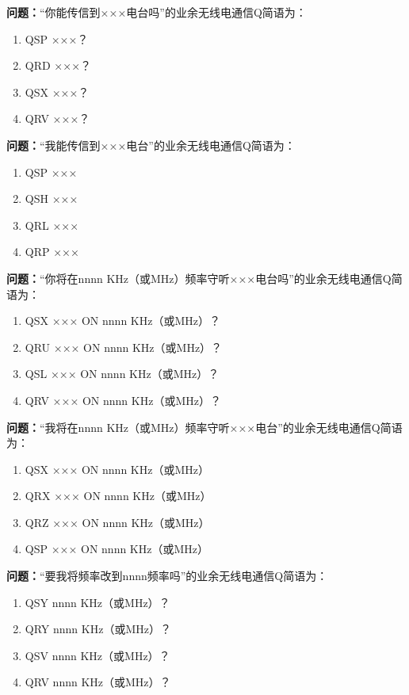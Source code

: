 \bigskip


\noindent\textbf{问题：}“你能传信到×××电台吗”的业余无线电通信Q简语为：
\begin{enumerate}[label=\Alph*), leftmargin=3em]
\item QSP ×××？
\item QRD ×××？
\item QSX ×××？
\item QRV ×××？
\end{enumerate}

\bigskip


\noindent\textbf{问题：}“我能传信到×××电台”的业余无线电通信Q简语为：
\begin{enumerate}[label=\Alph*), leftmargin=3em]
\item QSP ×××
\item QSH ×××
\item QRL ×××
\item QRP ×××
\end{enumerate}

\bigskip


\noindent\textbf{问题：}“你将在nnnn KHz（或MHz）频率守听×××电台吗”的业余无线电通信Q简语为：
\begin{enumerate}[label=\Alph*), leftmargin=3em]
\item QSX ××× ON nnnn KHz（或MHz）？
\item QRU ××× ON nnnn KHz（或MHz）？
\item QSL ××× ON nnnn KHz（或MHz）？
\item QRV ××× ON nnnn KHz（或MHz）？
\end{enumerate}

\bigskip


\noindent\textbf{问题：}“我将在nnnn KHz（或MHz）频率守听×××电台”的业余无线电通信Q简语为：
\begin{enumerate}[label=\Alph*), leftmargin=3em]
\item QSX ××× ON nnnn KHz（或MHz）
\item QRX ××× ON nnnn KHz（或MHz）
\item QRZ ××× ON nnnn KHz（或MHz）
\item QSP ××× ON nnnn KHz（或MHz）
\end{enumerate}

\bigskip


\noindent\textbf{问题：}“要我将频率改到nnnn频率吗”的业余无线电通信Q简语为：
\begin{enumerate}[label=\Alph*), leftmargin=3em]
\item QSY nnnn KHz（或MHz）？
\item QRY nnnn KHz（或MHz）？
\item QSV nnnn KHz（或MHz）？
\item QRV nnnn KHz（或MHz）？
\end{enumerate}

